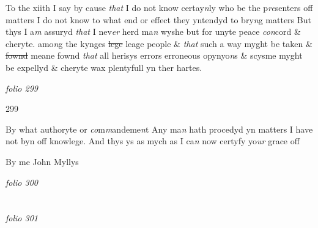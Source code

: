 \documentclass[12pt, a4paper]{book}
\begin{document}
 		
		\ifthenelse{\isodd{\thepage}}
		{\reversemarginpar}
		{\normalmarginpar}
		To the xiith I say by cause \textit{that} I do not know certay\textit{n}ly who be the p\textit{re}senters
off matters I do not know
			 to what end or effect they yntendyd to bry\textit{n}g matters But thys
I a\textit{m} assuryd \textit{that} I nev\textit{er} herd ma\textit{n} wyshe but for unyte peace \textit{con}cord \& cheryte. 
amo\textit{n}g the kynges \sout{lege} leage people \& \textit{that} such a way myght be taken
\& \sout{fownd }meane fownd \textit{that} all herisys errors erroneous opynyo\textit{n}s \& scysme
myght be expellyd \& cheryte wax plentyfull yn ther hartes.

\dotfill
						\newpage
{}

\textit{folio 299}


 	\begin{flushright}{\color{Mahogany}299}\end{flushright}

 	
				\marginpar[\vspace{0.5cm}{\textcolor{Gray}{12}}]{}
			

		\ifthenelse{\isodd{\thepage}}
		{\reversemarginpar}
		{\normalmarginpar}
		By what authoryte or \textit{co}m\textit{m}andeme\textit{n}t Any ma\textit{n} hath procedyd yn matters I
have not byn off knowlege. And thys ys as mych as I ca\textit{n} now certyfy
yo\textit{ur} grace off


		\ifthenelse{\isodd{\thepage}}
		{\reversemarginpar}
		{\normalmarginpar}
		By me John Myllys

\dotfill
						\newpage
{}

\textit{folio 300}


         \vspace*{4cm}
         
\dotfill
						  \section*{}  \subsection*{}

\textit{folio 301}
\end{document}
